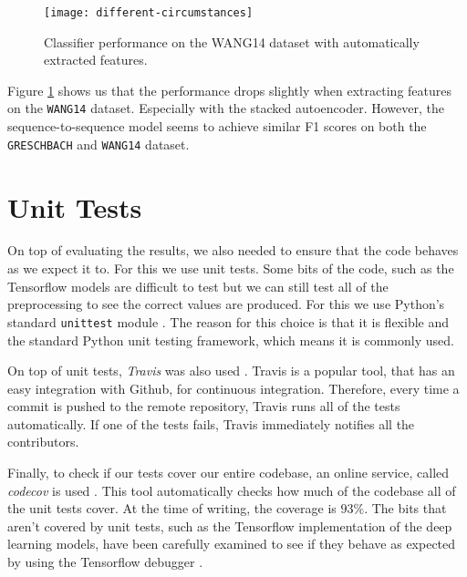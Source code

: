 \begin{figure}[ht]
  \centering
  \texttt{[image: different-circumstances]}
  \caption{Classifier performance on the WANG14 dataset with automatically extracted features.}
  \label{fig:different-circumstances}
\end{figure}

Figure \ref{fig:different-circumstances} shows us that the performance drops slightly when extracting features on the \texttt{WANG14} dataset.
Especially with the stacked autoencoder.
However, the sequence-to-sequence model seems to achieve similar F1 scores on both the \texttt{GRESCHBACH} and \texttt{WANG14} dataset.


\section{Unit Tests}

On top of evaluating the results, we also needed to ensure that the code behaves as we expect it to.
For this we use unit tests.
Some bits of the code, such as the Tensorflow models are difficult to test but we can still test all of the preprocessing to see the correct values are produced.
For this we use Python's standard \texttt{unittest} module \cite{python_unittest_documentation}.
The reason for this choice is that it is flexible and the standard Python unit testing framework, which means it is commonly used.

On top of unit tests, \textit{Travis} was also used \cite{travis}.
Travis is a popular tool, that has an easy integration with Github, for continuous integration.
Therefore, every time a commit is pushed to the remote repository, Travis runs all of the tests automatically.
If one of the tests fails, Travis immediately notifies all the contributors.

Finally, to check if our tests cover our entire codebase, an online service, called \textit{codecov} is used \cite{codecov}.
This tool automatically checks how much of the codebase all of the unit tests cover.
At the time of writing, the coverage is $93\%$.
The bits that aren't covered by unit tests, such as the Tensorflow implementation of the deep learning models, have been carefully examined to see if they behave as expected by using the Tensorflow debugger \cite{tensorflow}.
